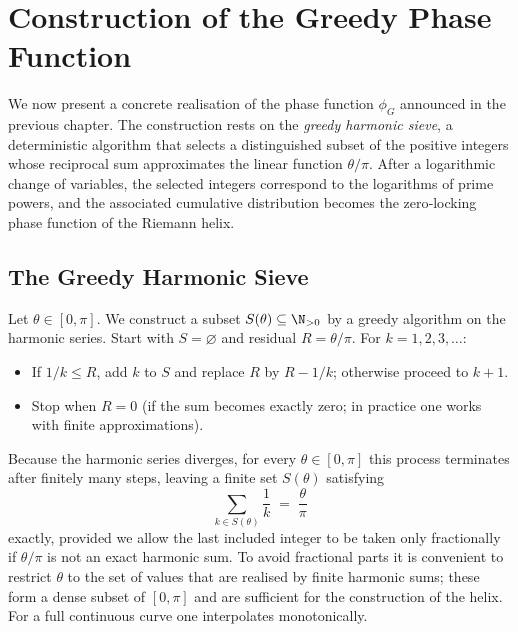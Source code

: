 \section{Construction of the Greedy Phase Function}\label{sec:greedy-phase}

We now present a concrete realisation of the phase function \(\phi_G\) announced in the previous chapter.  The construction rests on the \emph{greedy harmonic sieve}, a deterministic algorithm that selects a distinguished subset of the positive integers whose reciprocal sum approximates the linear function \(\theta/\pi\).  After a logarithmic change of variables, the selected integers correspond to the logarithms of prime powers, and the associated cumulative distribution becomes the zero‑locking phase function of the Riemann helix.

\subsection{The Greedy Harmonic Sieve}

Let \(\theta\in[0,\pi]\).  We construct a subset \(S(\theta)\subseteq\N_{>0}\) by a greedy algorithm on the harmonic series.  
Start with \(S=\varnothing\) and residual \(R=\theta/\pi\).  For \(k=1,2,3,\dots\):
\begin{itemize}
\item If \(1/k \le R\), add \(k\) to \(S\) and replace \(R\) by \(R-1/k\); otherwise proceed to \(k+1\).
\item Stop when \(R=0\) (if the sum becomes exactly zero; in practice one works with finite approximations).
\end{itemize}
Because the harmonic series diverges, for every \(\theta\in[0,\pi]\) this process terminates after finitely many steps, leaving a finite set \(S(\theta)\) satisfying
\[
\sum_{k\in S(\theta)} \frac1k \;=\; \frac{\theta}{\pi}\tag{1}
\]
exactly, provided we allow the last included integer to be taken only fractionally if \(\theta/\pi\) is not an exact harmonic sum.  To avoid fractional parts it is convenient to restrict \(\theta\) to the set of values that are realised by finite harmonic sums; these form a dense subset of \([0,\pi]\) and are sufficient for the construction of the helix.  For a full continuous curve one interpolates monotonically.

